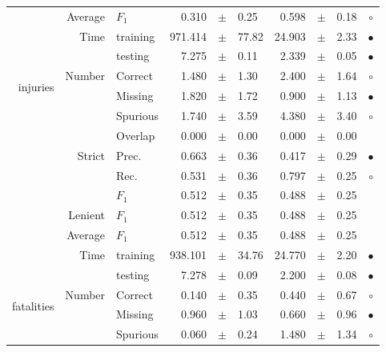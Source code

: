 \begin{longtable}{|r|r|l||rcl|rcl|c|}
\cline{2-10}
  & Average &  $F_1$  & 0.310 &  $\pm$  & 0.25 & 0.598 &  $\pm$  & 0.18 &  $\circ$\\
\cline{2-10}
  & \multirow{2}{*}{Time} &  training  & 971.414 &  $\pm$  & 77.82 & 24.903 &  $\pm$  & 2.33 &  $\bullet$\\
\cline{3-10}
  &  &  testing  & 7.275 &  $\pm$  & 0.11 & 2.339 &  $\pm$  & 0.05 &  $\bullet$\\
\hline
\hline
\multirow{11}{*}{\begin{sideways}injuries\end{sideways} } & \multirow{4}{*}{Number} &  Correct  & 1.480 &  $\pm$  & 1.30 & 2.400 &  $\pm$  & 1.64 &  $\circ$\\
\cline{3-10}
  &  &  Missing  & 1.820 &  $\pm$  & 1.72 & 0.900 &  $\pm$  & 1.13 &  $\bullet$\\
\cline{3-10}
  &  &  Spurious  & 1.740 &  $\pm$  & 3.59 & 4.380 &  $\pm$  & 3.40 &  $\circ$\\
\cline{3-10}
  &  &  Overlap  & 0.000 &  $\pm$  & 0.00 & 0.000 &  $\pm$  & 0.00 &   \\
\cline{2-10}
  & \multirow{3}{*}{Strict} &  Prec.  & 0.663 &  $\pm$  & 0.36 & 0.417 &  $\pm$  & 0.29 &  $\bullet$\\
\cline{3-10}
  &  &  Rec.  & 0.531 &  $\pm$  & 0.36 & 0.797 &  $\pm$  & 0.25 &  $\circ$\\
\cline{3-10}
  &  &  $F_1$  & 0.512 &  $\pm$  & 0.35 & 0.488 &  $\pm$  & 0.25 &   \\
\cline{2-10}
  & Lenient &  $F_1$  & 0.512 &  $\pm$  & 0.35 & 0.488 &  $\pm$  & 0.25 &   \\
\cline{2-10}
  & Average &  $F_1$  & 0.512 &  $\pm$  & 0.35 & 0.488 &  $\pm$  & 0.25 &   \\
\cline{2-10}
  & \multirow{2}{*}{Time} &  training  & 938.101 &  $\pm$  & 34.76 & 24.770 &  $\pm$  & 2.20 &  $\bullet$\\
\cline{3-10}
  &  &  testing  & 7.278 &  $\pm$  & 0.09 & 2.200 &  $\pm$  & 0.08 &  $\bullet$\\
\hline
\hline
\multirow{11}{*}{\begin{sideways}fatalities\end{sideways} } & \multirow{4}{*}{Number} &  Correct  & 0.140 &  $\pm$  & 0.35 & 0.440 &  $\pm$  & 0.67 &  $\circ$\\
\cline{3-10}
  &  &  Missing  & 0.960 &  $\pm$  & 1.03 & 0.660 &  $\pm$  & 0.96 &  $\bullet$\\
\cline{3-10}
  &  &  Spurious  & 0.060 &  $\pm$  & 0.24 & 1.480 &  $\pm$  & 1.34 &  $\circ$\\

\end{longtable}
